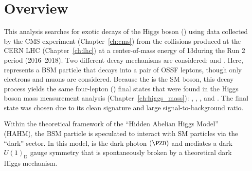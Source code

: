 \section{Overview}
This analysis searches for exotic decays of the Higgs boson (\PH) using data collected by the CMS experiment (Chapter~\ref{ch:cms}) from the \pp collisions produced at the CERN LHC (Chapter~\ref{ch:lhc}) at a center-of-mass energy of 13\TeV during the Run 2 period (2016--2018).
Two different decay mechanisms are considered: \htozx and \htoxx.
Here, \PX represents a BSM particle that decays into a pair of OSSF leptons, though only electrons and muons are considered.
Because the \PZ is the SM \PZ boson, this decay process yields the same four-lepton (\fourl) final states that were found in the Higgs boson mass measurement analysis (Chapter~\ref{ch:higgs_mass}):
\foure, \fourmu, \twoetwomu, and \twomutwoe.
The \fourl final state was chosen due to its clean signature and large signal-to-background ratio.

Within the theoretical framework of the ``Hidden Abelian Higgs Model'' (HAHM), the BSM particle \PX is speculated to interact with SM particles via the ``dark'' sector.  %
In this model, \PX is the dark photon $\left( \PZD \right)$ and mediates a dark $U(1)_\text{D}$ gauge symmetry that is spontaneously broken by a theoretical dark Higgs mechanism.

